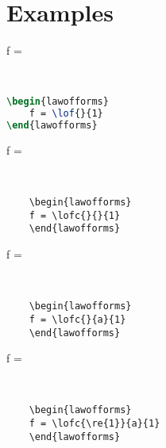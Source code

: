 \documentclass[12pt]{article}
\begin{document}
\section{Examples}\label{examples}
\begin{minipage}[c]{.45\textwidth}
	\begin{lawofforms}
		f = 
	\end{lawofforms}
\end{minipage}~~
\begin{minipage}[c]{.45\textwidth}
\begin{lstlisting}[language=TeX]
\begin{lawofforms}
	f = \lof{}{1}
\end{lawofforms}
\end{lstlisting}
\end{minipage}


\begin{minipage}[c]{.45\textwidth}
	\begin{lawofforms}
		f = 
	\end{lawofforms}
	
\end{minipage}~~
\begin{minipage}[c]{.5\textwidth}
	\begin{lstlisting}
	\begin{lawofforms}
	f = \lofc{}{}{1}
	\end{lawofforms}
	\end{lstlisting}
\end{minipage}


\begin{minipage}[c]{.45\textwidth}
	\begin{lawofforms}
		f = 
	\end{lawofforms}
\end{minipage}~~
\begin{minipage}[c]{.5\textwidth}
	\begin{lstlisting}
	\begin{lawofforms}
	f = \lofc{}{a}{1}
	\end{lawofforms}
	\end{lstlisting}
\end{minipage}


\begin{minipage}[c]{.45\textwidth}
	\begin{lawofforms}
		f = 
	\end{lawofforms}
\end{minipage}~~
\begin{minipage}[c]{.5\textwidth}
	\begin{lstlisting}
	\begin{lawofforms}
	f = \lofc{\re{1}}{a}{1}
	\end{lawofforms}
	\end{lstlisting}
\end{minipage}
\end{document}
